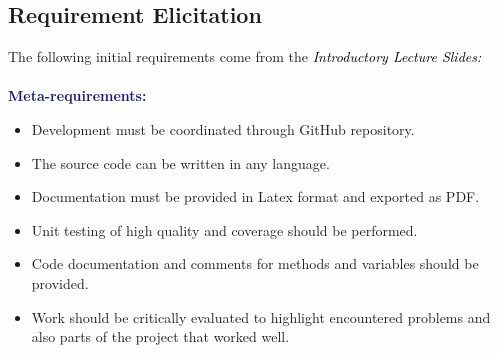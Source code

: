 \documentclass{article}
\begin{document}
	
	
	\subsection{Requirement Elicitation}	
	
	
	The following initial requirements come from the \textcolor{black}{\emph{Introductory Lecture Slides:}}\\\\
	{\bf\textcolor{MidnightBlue}{Meta-requirements:}}
	\begin{itemize}
		
		\item Development must be coordinated through GitHub repository.
		\item The source code can be written in any language.
		\item Documentation must be provided in Latex format and exported as PDF.
		\item Unit testing of high quality and coverage should be performed.
		\item Code documentation and comments for methods and variables should be provided.
		\item Work should be critically evaluated to highlight encountered problems and also parts of the project that worked well.
	\end{itemize}
	
\end{document}
